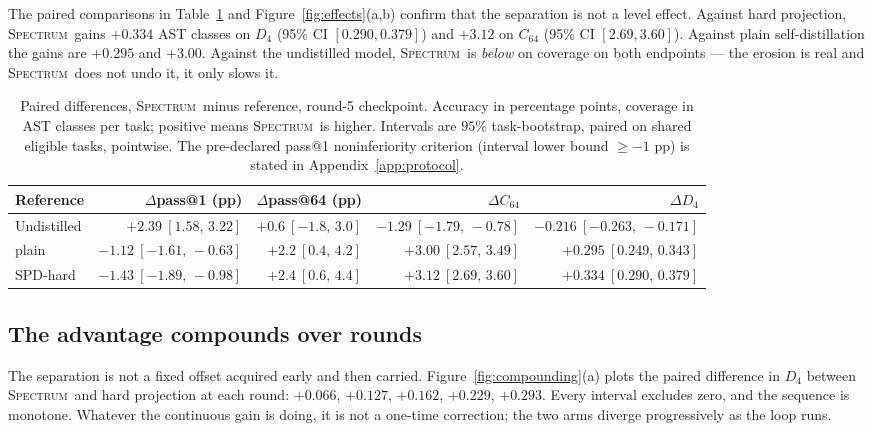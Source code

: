 \documentclass{article}
\newcommand{\method}{\textsc{Spectrum}}
\begin{document}
The paired comparisons in Table~\ref{tab:paired} and Figure~\ref{fig:effects}(a,b) confirm that the separation is not a level effect. Against hard projection, \method\ gains $+0.334$ AST classes on $D_4$ (95\% CI $[0.290,0.379]$) and $+3.12$ on $C_{64}$ (95\% CI $[2.69,3.60]$). Against plain self-distillation the gains are $+0.295$ and $+3.00$. Against the undistilled model, \method\ is \emph{below} on coverage on both endpoints --- the erosion is real and \method\ does not undo it, it only slows it.

\begin{table}[t]
\caption{\small Paired differences, \method\ minus reference, round-5 checkpoint. Accuracy in percentage points, coverage in AST classes per task; positive means \method\ is higher. Intervals are $95\%$ task-bootstrap, paired on shared eligible tasks, pointwise. The pre-declared pass@1 noninferiority criterion (interval lower bound $\ge -1$ pp) is stated in Appendix~\ref{app:protocol}.}
\label{tab:paired}
\centering\small
\begin{tabular}{lrrrr}
\toprule
Reference & $\Delta$pass@1 (pp) & $\Delta$pass@64 (pp) & $\Delta C_{64}$ & $\Delta D_4$ \\
\midrule
Undistilled & $+2.39\ [1.58,\,3.22]$ & $+0.6\ [-1.8,\,3.0]$ & $-1.29\ [-1.79,\,-0.78]$ & $-0.216\ [-0.263,\,-0.171]$ \\
plain       & $-1.12\ [-1.61,\,-0.63]$ & $+2.2\ [0.4,\,4.2]$ & $+3.00\ [2.57,\,3.49]$ & $+0.295\ [0.249,\,0.343]$ \\
SPD-hard    & $-1.43\ [-1.89,\,-0.98]$ & $+2.4\ [0.6,\,4.4]$ & $+3.12\ [2.69,\,3.60]$ & $+0.334\ [0.290,\,0.379]$ \\
\bottomrule
\end{tabular}
\end{table}

\subsection{The advantage compounds over rounds}
\label{sec:compound}

The separation is not a fixed offset acquired early and then carried. Figure~\ref{fig:compounding}(a) plots the paired difference in $D_4$ between \method\ and hard projection at each round: $+0.066$, $+0.127$, $+0.162$, $+0.229$, $+0.293$. Every interval excludes zero, and the sequence is monotone. Whatever the continuous gain is doing, it is not a one-time correction; the two arms diverge progressively as the loop runs.
\end{document}
